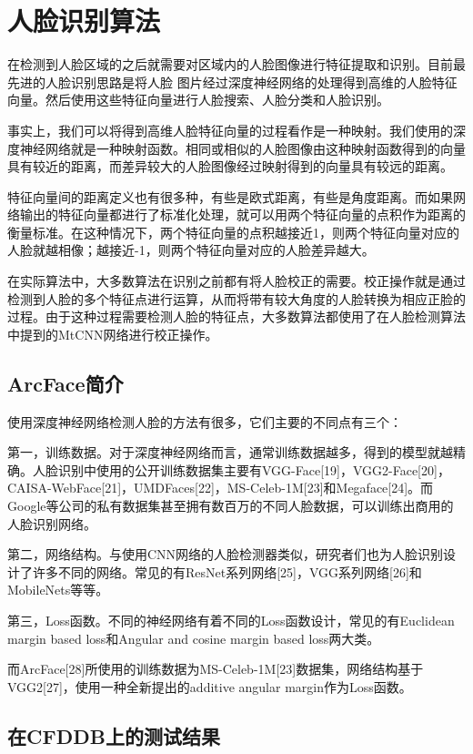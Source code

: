 \chapter{人脸识别算法}
\label{facerecognition}

在检测到人脸区域的之后就需要对区域内的人脸图像进行特征提取和识别。目前最先进的人脸识别思路是将人脸 图片经过深度神经网络的处理得到高维的人脸特征向量。然后使用这些特征向量进行人脸搜索、人脸分类和人脸识别。

事实上，我们可以将得到高维人脸特征向量的过程看作是一种映射。我们使用的深度神经网络就是一种映射函数。相同或相似的人脸图像由这种映射函数得到的向量具有较近的距离，而差异较大的人脸图像经过映射得到的向量具有较远的距离。

特征向量间的距离定义也有很多种，有些是欧式距离，有些是角度距离。而如果网络输出的特征向量都进行了标准化处理，就可以用两个特征向量的点积作为距离的衡量标准。在这种情况下，两个特征向量的点积越接近1，则两个特征向量对应的人脸就越相像；越接近-1，则两个特征向量对应的人脸差异越大。

在实际算法中，大多数算法在识别之前都有将人脸校正的需要。校正操作就是通过检测到人脸的多个特征点进行运算，从而将带有较大角度的人脸转换为相应正脸的过程。由于这种过程需要检测人脸的特征点，大多数算法都使用了在人脸检测算法中提到的MtCNN网络进行校正操作。

\section{ArcFace简介}

使用深度神经网络检测人脸的方法有很多，它们主要的不同点有三个：

第一，训练数据。对于深度神经网络而言，通常训练数据越多，得到的模型就越精确。人脸识别中使用的公开训练数据集主要有VGG-Face[19]，VGG2-Face[20]，CAISA-WebFace[21]，UMDFaces[22]，MS-Celeb-1M[23]和Megaface[24]。而Google等公司的私有数据集甚至拥有数百万的不同人脸数据，可以训练出商用的人脸识别网络。

第二，网络结构。与使用CNN网络的人脸检测器类似，研究者们也为人脸识别设计了许多不同的网络。常见的有ResNet系列网络[25]，VGG系列网络[26]和MobileNets等等。

第三，Loss函数。不同的神经网络有着不同的Loss函数设计，常见的有Euclidean margin based loss和Angular and cosine margin based loss两大类。

而ArcFace[28]所使用的训练数据为MS-Celeb-1M[23]数据集，网络结构基于VGG2[27]，使用一种全新提出的additive angular margin作为Loss函数。

\section{在CFDDB上的测试结果}